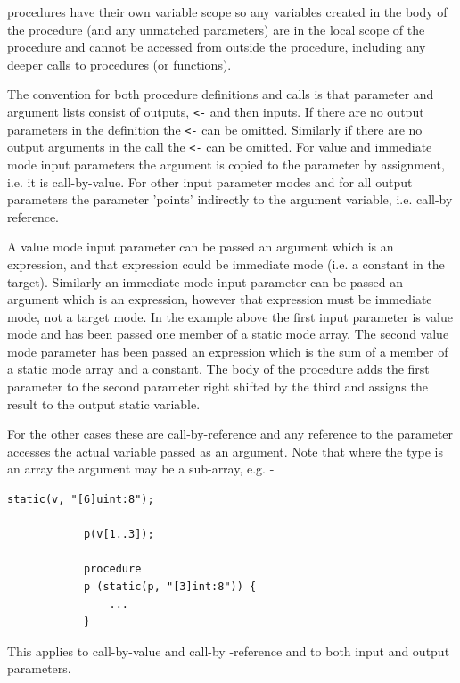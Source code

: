         procedures have their own variable scope so any variables created in the
        body of the procedure (and any unmatched parameters) are in the local
        scope of the procedure and cannot be accessed from outside the procedure,
        including any deeper calls to procedures (or functions).

        The convention for both procedure definitions and calls is that parameter and
        argument lists consist of outputs, \verb'<-' and then inputs. If there are no
        output parameters in the definition the \verb'<-' can be omitted. Similarly if
        there are no output arguments in the call the \verb'<-' can be omitted. For
        value and immediate mode input parameters the argument is copied to the
        parameter by assignment, i.e. it is call-by-value. For other input parameter
        modes and for all output parameters the parameter 'points' indirectly to the
        argument variable, i.e. call-by reference.

        A value mode input parameter can be passed an argument which is an expression,
        and that expression could be immediate mode (i.e. a constant in the target).
        Similarly an immediate mode input parameter can be passed an argument which
        is an expression, however that expression must be immediate mode, not a
        target mode. In the example above the first input parameter is value mode
        and has been passed one member of a static mode array. The second value
        mode parameter has been passed an expression which is the sum of a
        member of a static mode array and a constant. The body of the procedure
        adds the first parameter to the second parameter right shifted by the
        third and assigns the result to the output static variable.

        For the other cases these are call-by-reference and any reference to the
        parameter accesses the actual variable passed as an argument. Note that
        where the type is an array the argument may be a sub-array,
        e.g. -
        \begin{lstlisting}[language=threepl]
            static(v, "[6]uint:8");

            p(v[1..3]);

            procedure
            p (static(p, "[3]int:8")) {
                ...
            }
        \end{lstlisting}
        This applies to call-by-value and call-by -reference and to both input and
        output parameters.

